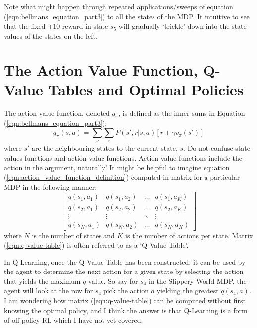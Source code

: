 \documentclass[a4paper,11pt]{article}
\begin{document}
Note what might happen through repeated applications/sweeps of equation (\ref{eqn:bellmans_equation_part3}) to all the states of the MDP.  It intuitive to see that the fixed +10 reward in state $s_5$ will gradually `trickle' down into the state values of the states on the left.  



\section{The Action Value Function, Q-Value Tables and Optimal Policies}

The action value function, denoted $q_{\pi}$, is defined as the inner sums in Equation (\ref{eqn:bellmans_equation_part3}):
\begin{equation} \label{eqn:action_value_function_definition}
    q_{\pi}(s,a) = \sum_{s'} \sum_r P(s',r|s,a) [r + \gamma v_{\pi}(s')]
\end{equation}
where $s'$ are the neighbouring states to the current state, $s$.  Do not confuse state values functions and action value functions.  Action value functions include the action in the argument, naturally!  It might be helpful to imagine equation (\ref{eqn:action_value_function_definition}) computed in matrix for a particular MDP in the following manner:
\begin{equation} \label{eqn:q-value-table}
\begin{bmatrix}
    q(s_1,a_1) & q(s_1,a_2) & \hdots & q(s_1,a_K) \\
    q(s_2,a_1) & q(s_2,a_2) & \hdots & q(s_2,a_K) \\
    \vdots & \vdots & \ddots & \vdots \\
    q(s_N,a_1) & q(s_N,a_2) & \hdots & q(s_N,a_K)
\end{bmatrix}
\end{equation}
where $N$ is the number of states and $K$ is the number of actions per state.  Matrix (\ref{eqn:q-value-table}) is often referred to as a `Q-Value Table'.  

In Q-Learning, once the Q-Value Table has been constructed, it can be used by the agent to determine the next action for a given state by selecting the action that yields the maximum $q$ value.  So say for $s_4$ in the Slippery World MDP, the agent will look at the row for $s_4$ pick the action $a$ yielding the greatest $q(s_4, a)$.  I am wondering how matrix (\ref{eqn:q-value-table}) can be computed without first knowing the optimal policy, and I think the answer is that Q-Learning is a form of off-policy RL which I have not yet covered.
\end{document}
